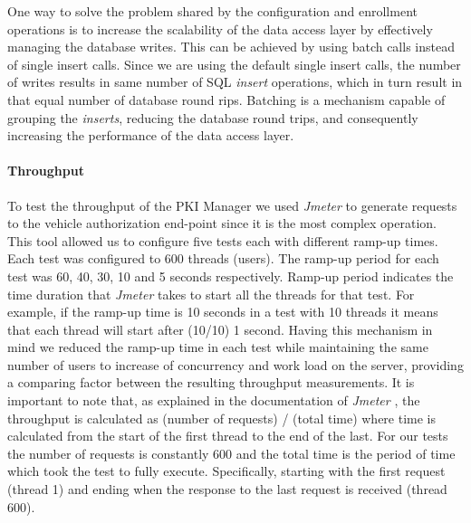 	One way to solve the problem shared by the configuration and enrollment operations is to increase the scalability of the data access layer by effectively managing the database writes. This can be achieved by using batch calls instead of single insert calls. Since we are using the default single insert calls, the number of writes results in same number of SQL \textit{insert} operations, which in turn result in that equal number of database round rips. Batching is a mechanism capable of grouping the \textit{inserts}, reducing the database round trips, and consequently increasing the performance of the data access layer. 
	
	\paragraph{Throughput}
	
	To test the throughput of the PKI Manager we used \textit{Jmeter} to generate requests to the vehicle authorization end-point since it is the most complex operation. This tool allowed us to configure five tests each with different ramp-up times. Each test was configured to 600 threads (users). The ramp-up period for each test was 60, 40, 30, 10 and 5 seconds respectively. Ramp-up period indicates the time duration that \textit{Jmeter} takes to start all the threads for that test. For example, if the ramp-up time is 10 seconds in a test with 10 threads it means that each thread will start after (10/10) 1 second. Having this mechanism in mind we reduced the ramp-up time in each test while maintaining the same number of users to increase of concurrency and work load on the server, providing a comparing factor between the resulting throughput measurements. It is important to note that, as explained in the documentation of \textit{Jmeter} \cite{throughput}, the throughput is calculated as (number of requests) / (total time) where time is calculated from the start of the first thread to the end of the last. For our tests the number of requests is constantly 600 and the total time is the period of time which took the test to fully execute. Specifically, starting with the first request (thread 1) and ending when the response to the last request is received (thread 600).
	
